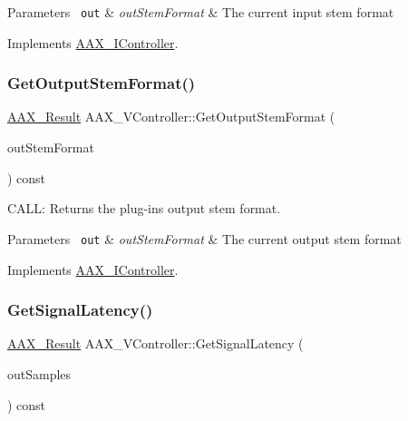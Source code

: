\begin{DoxyParams}[1]{Parameters}
\mbox{\texttt{ out}}  & {\em out\+Stem\+Format} & The current input stem format \\
\hline
\end{DoxyParams}


Implements \mbox{\hyperlink{a01789_ab024489b47d3d5d2bcd52c9859aba663}{A\+A\+X\+\_\+\+I\+Controller}}.

\mbox{\label{a01905_a01a96e488251716cfc236551b9f9a2fb}} 
\subsubsection{\texorpdfstring{GetOutputStemFormat()}{GetOutputStemFormat()}}
{\footnotesize\ttfamily \mbox{\hyperlink{a00392_a4d8f69a697df7f70c3a8e9b8ee130d2f}{A\+A\+X\+\_\+\+Result}} A\+A\+X\+\_\+\+V\+Controller\+::\+Get\+Output\+Stem\+Format (\begin{DoxyParamCaption}\item[{\mbox{\hyperlink{a00491_ad8af5ef008b2bd478add9a0acb0a1d85}{A\+A\+X\+\_\+\+E\+Stem\+Format}} $\ast$}]{out\+Stem\+Format }\end{DoxyParamCaption}) const\hspace{0.3cm}{\ttfamily [virtual]}}



C\+A\+LL\+: Returns the plug-\/in\textquotesingle{}s output stem format. 


\begin{DoxyParams}[1]{Parameters}
\mbox{\texttt{ out}}  & {\em out\+Stem\+Format} & The current output stem format \\
\hline
\end{DoxyParams}


Implements \mbox{\hyperlink{a01789_aabe72e915df571776d4aa1c36ef8d6f2}{A\+A\+X\+\_\+\+I\+Controller}}.

\mbox{\label{a01905_ab73ab5f51350ae61a73542231948c81c}} 
\subsubsection{\texorpdfstring{GetSignalLatency()}{GetSignalLatency()}}
{\footnotesize\ttfamily \mbox{\hyperlink{a00392_a4d8f69a697df7f70c3a8e9b8ee130d2f}{A\+A\+X\+\_\+\+Result}} A\+A\+X\+\_\+\+V\+Controller\+::\+Get\+Signal\+Latency (\begin{DoxyParamCaption}\item[{int32\+\_\+t $\ast$}]{out\+Samples }\end{DoxyParamCaption}) const\hspace{0.3cm}{\ttfamily [virtual]}}



